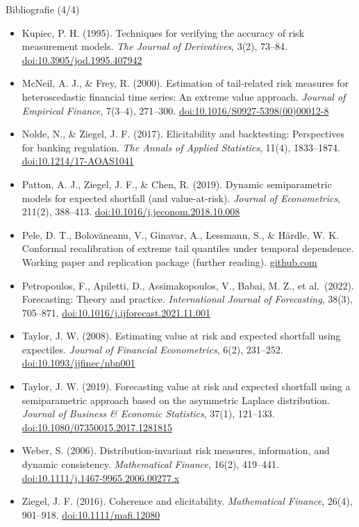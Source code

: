 \begin{frame}{Bibliografie (4/4)}
\itemsize{\tiny}
\begin{itemize}
    \item Kupiec, P. H. (1995). Techniques for verifying the accuracy of risk measurement models. \textit{The Journal of Derivatives}, 3(2), 73--84. \href{https://doi.org/10.3905/jod.1995.407942}{doi:10.3905/jod.1995.407942}
    \item McNeil, A. J., \& Frey, R. (2000). Estimation of tail-related risk measures for heteroscedastic financial time series: An extreme value approach. \textit{Journal of Empirical Finance}, 7(3--4), 271--300. \href{https://doi.org/10.1016/S0927-5398(00)00012-8}{doi:10.1016/S0927-5398(00)00012-8}
    \item Nolde, N., \& Ziegel, J. F. (2017). Elicitability and backtesting: Perspectives for banking regulation. \textit{The Annals of Applied Statistics}, 11(4), 1833--1874. \href{https://doi.org/10.1214/17-AOAS1041}{doi:10.1214/17-AOAS1041}
    \item Patton, A. J., Ziegel, J. F., \& Chen, R. (2019). Dynamic semiparametric models for expected shortfall (and value-at-risk). \textit{Journal of Econometrics}, 211(2), 388--413. \href{https://doi.org/10.1016/j.jeconom.2018.10.008}{doi:10.1016/j.jeconom.2018.10.008}
    \item Pele, D. T., Bolovăneanu, V., Ginavar, A., Lessmann, S., \& Härdle, W. K. Conformal recalibration of extreme tail quantiles under temporal dependence. Working paper and replication package (further reading). \href{https://github.com/danpele/Conformal_Oracle}{github.com}
    \item Petropoulos, F., Apiletti, D., Assimakopoulos, V., Babai, M. Z., et al.\ (2022). Forecasting: Theory and practice. \textit{International Journal of Forecasting}, 38(3), 705--871. \href{https://doi.org/10.1016/j.ijforecast.2021.11.001}{doi:10.1016/j.ijforecast.2021.11.001}
    \item Taylor, J. W. (2008). Estimating value at risk and expected shortfall using expectiles. \textit{Journal of Financial Econometrics}, 6(2), 231--252. \href{https://doi.org/10.1093/jjfinec/nbn001}{doi:10.1093/jjfinec/nbn001}
    \item Taylor, J. W. (2019). Forecasting value at risk and expected shortfall using a semiparametric approach based on the asymmetric Laplace distribution. \textit{Journal of Business \& Economic Statistics}, 37(1), 121--133. \href{https://doi.org/10.1080/07350015.2017.1281815}{doi:10.1080/07350015.2017.1281815}
    \item Weber, S. (2006). Distribution-invariant risk measures, information, and dynamic consistency. \textit{Mathematical Finance}, 16(2), 419--441. \href{https://doi.org/10.1111/j.1467-9965.2006.00277.x}{doi:10.1111/j.1467-9965.2006.00277.x}
    \item Ziegel, J. F. (2016). Coherence and elicitability. \textit{Mathematical Finance}, 26(4), 901--918. \href{https://doi.org/10.1111/mafi.12080}{doi:10.1111/mafi.12080}
\end{itemize}
\end{frame}


